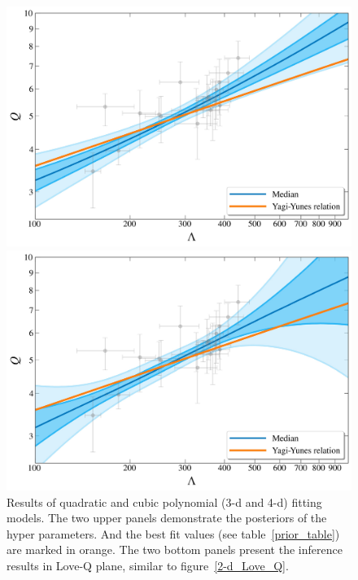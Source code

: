 \documentclass[a4paper,11pt]{article}
\begin{document}
\begin{figure}
    \begin{minipage}[t]{0.49\textwidth}
    \includegraphics[width=\linewidth]{hierarchical_results_AP4_3d.pdf}%
    \end{minipage}
    \hfill
    \begin{minipage}[t]{0.49\textwidth}
    \includegraphics[width=\linewidth]{hierarchical_results_AP4_4d.pdf}
    \end{minipage}
    \caption{\label{3-d_4-d_Love_Q} Results of quadratic and cubic polynomial (3-d and 4-d) fitting models. The 
    two upper panels demonstrate the posteriors of the hyper parameters. And the best fit values (see table~\ref{prior_table}) 
    are marked in orange. The two bottom panels present the inference results in Love-Q plane, similar to 
    figure~\ref{2-d_Love_Q}.
    }
\end{figure}
\end{document}
